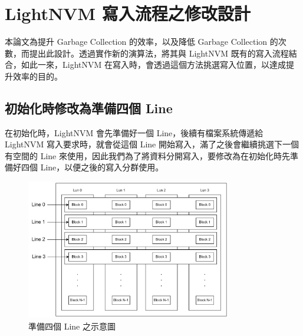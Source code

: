 \chapter{LightNVM 寫入流程之修改設計}
\indent
本論文為提升 Garbage Collection 的效率，以及降低 Garbage Collection 的次數，而提出此設計。透過實作新的演算法，將其與 LightNVM 既有的寫入流程結合，如此一來，LightNVM 在寫入時，會透過這個方法挑選寫入位置，以達成提升效率的目的。


%
\section{初始化時修改為準備四個 Line}\label{s3.1}
\indent
在初始化時，LightNVM 會先準備好一個 Line，後續有檔案系統傳遞給 LightNVM 寫入要求時，就會從這個 Line 開始寫入，滿了之後會繼續挑選下一個有空間的 Line 來使用，因此我們為了將資料分開寫入，要修改為在初始化時先準備好四個 Line，以便之後的寫入分群使用。

\begin{figure}[H]
    \centering
    \includegraphics[width=0.8\textwidth]{picture/ch3/4Line.png}
    \caption{準備四個 Line 之示意圖}
    \label{f3.1}
\end{figure}

